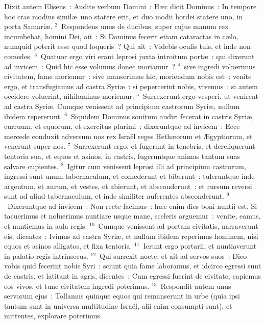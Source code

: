 \bchapter
\lettrine[lines=3,image=true,loversize=0.05,lraise=-0.03]{D}{}ixit autem Eliseus~: Audite verbum Domini~: H\ae c dicit Dominus~: In tempore hoc cras modius simil\ae\ uno statere erit, et duo modii hordei statere uno, in porta Samari\ae .
${}^{2}$~Respondens unus de ducibus, super cujus manum rex incumbebat, homini Dei, ait~: Si Dominus fecerit etiam cataractas in c\ae lo, numquid poterit esse quod loqueris~? Qui ait~: Videbis oculis tuis, et inde non comedes.
${}^{3}$~Quatuor ergo viri erant leprosi juxta introitum port\ae~: qui dixerunt ad invicem~: Quid hic esse volumus donec moriamur~?
${}^{4}$~sive ingredi voluerimus civitatem, fame moriemur~: sive manserimus hic, moriendum nobis est~: venite ergo, et transfugiamus ad castra Syri\ae~: si pepercerint nobis, vivemus~: si autem occidere voluerint, nihilominus moriemur.
${}^{5}$~Surrexerunt ergo vesperi, ut venirent ad castra Syri\ae . Cumque venissent ad principium castrorum Syri\ae , nullum ibidem repererunt.
${}^{6}$~Siquidem Dominus sonitum audiri fecerat in castris Syri\ae , curruum, et equorum, et exercitus plurimi~: dixeruntque ad invicem~: Ecce mercede conduxit adversum nos rex Isra\"el reges Heth\ae orum et \AE gyptiorum, et venerunt super nos.
${}^{7}$~Surrexerunt ergo, et fugerunt in tenebris, et dereliquerunt tentoria sua, et equos et asinos, in castris, fugeruntque animas tantum suas salvare cupientes.
${}^{8}$~Igitur cum venissent leprosi illi ad principium castrorum, ingressi sunt unum tabernaculum, et comederunt et biberunt~: tuleruntque inde argentum, et aurum, et vestes, et abierunt, et absconderunt~: et rursum reversi sunt ad aliud tabernaculum, et inde similiter auferentes absconderunt.
${}^{9}$~Dixeruntque ad invicem~: Non recte facimus~: h\ae c enim dies boni nuntii est. Si tacuerimus et noluerimus nuntiare usque mane, sceleris arguemur~: venite, eamus, et nuntiemus in aula regis.
${}^{10}$~Cumque venissent ad portam civitatis, narraverunt eis, dicentes~: Ivimus ad castra Syri\ae , et nullum ibidem reperimus hominem, nisi equos et asinos alligatos, et fixa tentoria.
${}^{11}$~Ierunt ergo portarii, et nuntiaverunt in palatio regis intrinsecus.
${}^{12}$~Qui surrexit nocte, et ait ad servos suos~: Dico vobis quid fecerint nobis Syri~: sciunt quia fame laboramus, et idcirco egressi sunt de castris, et latitant in agris, dicentes~: Cum egressi fuerint de civitate, capiemus eos vivos, et tunc civitatem ingredi poterimus.
${}^{13}$~Respondit autem unus servorum ejus~: Tollamus quinque equos qui remanserunt in urbe (quia ipsi tantum sunt in universa multitudine Isra\"el, alii enim consumpti sunt), et mittentes, explorare poterimus.
